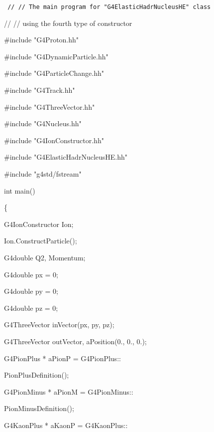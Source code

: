 \documentclass[12pt]{article}
\begin{document}
\vspace{2ex}
{\tt
// //  The main program for "G4ElasticHadrNucleusHE" class

// //  using the fourth type of constructor


\#include "G4Proton.hh"

\#include "G4DynamicParticle.hh"

\#include "G4ParticleChange.hh"

\#include "G4Track.hh"

\#include "G4ThreeVector.hh"

\#include "G4Nucleus.hh"

\#include "G4IonConstructor.hh"

\#include "G4ElasticHadrNucleusHE.hh"

\#include "g4std/fstream"

 int main()


 \{

\hspace{1cm}  G4IonConstructor Ion;

\hspace{1cm}  Ion.ConstructParticle();

\hspace{1cm}  G4double        Q2, Momentum;

\hspace{1cm}  G4double        px = 0;

\hspace{1cm}  G4double        py = 0;

\hspace{1cm}  G4double        pz = 0;

\hspace{1cm}  G4ThreeVector   inVector(px, py, pz);

\hspace{1cm}  G4ThreeVector   outVector, aPosition(0., 0., 0.);

\hspace{1cm}  G4PionPlus        *  aPionP    = G4PionPlus::

\hspace{5cm}              PionPlusDefinition();

\hspace{1cm}  G4PionMinus       *  aPionM    = G4PionMinus::

\hspace{5cm}            PionMinusDefinition();

\hspace{1cm}   G4KaonPlus        *  aKaonP    = G4KaonPlus::

}
\end{document}
